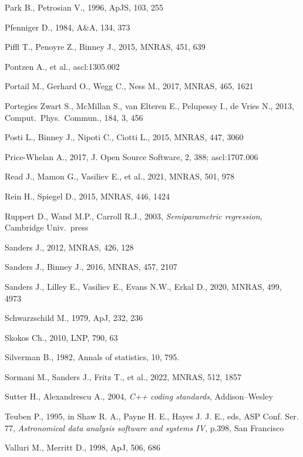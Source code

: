 \documentclass[12pt]{article}
\begin{document}
\begin{thebibliography}{99}
Park B., Petrosian V., 1996, ApJS, 103, 255

Pfenniger D., 1984, A\&A, 134, 373

Piffl T., Penoyre Z., Binney J., 2015, MNRAS, 451, 639

Pontzen A., et al., ascl:1305.002

Portail M., Gerhard O., Wegg C., Ness M., 2017, MNRAS, 465, 1621

Portegies Zwart S., McMillan S., van Elteren E., Pelupessy I., de Vries N., 2013, Comput.\ Phys.\ Commun., 184, 3, 456

Posti L., Binney J., Nipoti C., Ciotti L., 2015, MNRAS, 447, 3060

Price-Whelan A., 2017, J. Open Source Software, 2, 388; ascl:1707.006

Read J., Mamon G., Vasiliev E., et al., 2021, MNRAS, 501, 978

Rein H., Spiegel D., 2015, MNRAS, 446, 1424

Ruppert D., Wand M.P., Carroll R.J., 2003, \textsl{Semiparametric regression}, Cambridge Univ.\ press

Sanders J., 2012, MNRAS, 426, 128

Sanders J., Binney J., 2016, MNRAS, 457, 2107

Sanders J., Lilley E., Vasiliev E., Evans N.W., Erkal D., 2020, MNRAS, 499, 4973

Schwarzschild M., 1979, ApJ, 232, 236

Skokos Ch., 2010, LNP, 790, 63

Silverman B., 1982, Annals of statistics, 10, 795.

Sormani M., Sanders J., Fritz T., et al., 2022, MNRAS, 512, 1857

Sutter H., Alexandrescu A., 2004, \textsl{C++ coding standards}, Addison--Wesley

Teuben P., 1995, in Shaw R. A., Payne H. E., Hayes J. J. E., eds, ASP Conf. Ser. 77,
\textsl{Astronomical data analysis software and systems IV}, p.398, San Francisco

Valluri M., Merritt D., 1998, ApJ, 506, 686


\end{thebibliography}
\end{document}
